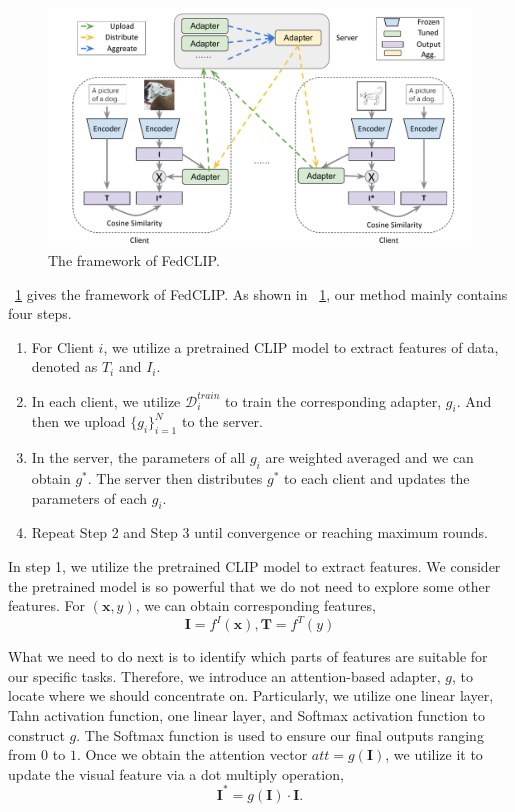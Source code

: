 \documentclass[11pt]{article}
\newcommand{\method}{FedCLIP\xspace}
\newcommand{\wjd}[1]{{\color{cyan}{[(WJD): #1]}}}
\begin{document}
\begin{figure}[t]
	\centering
    \includegraphics[width=.9\textwidth]{fig/frame.pdf}
	\caption{The framework of \method.} %
	\label{fig:frame1}
\end{figure}

\figurename~\ref{fig:frame1} gives the framework of \method.
As shown in \figurename~\ref{fig:frame1}, our method mainly contains four steps.

\begin{enumerate}
    \item For Client $i$, we utilize a pretrained CLIP model to extract features of data, denoted as $T_i$ and $I_i$.
    \item In each client, we utilize $\mathcal{D}^{train}_i$ to train the corresponding adapter, $g_i$. And then we upload $\{g_i\}_{i=1}^N$ to the server.
    \item In the server, the parameters of all $g_i$ are weighted averaged and we can obtain $g^*$. The server then distributes $g^*$ to each client and updates the parameters of each $g_i$.
    \item Repeat Step 2 and Step 3 until convergence or reaching maximum rounds.
\end{enumerate}

In step 1, we utilize the pretrained CLIP model to extract features. We consider the pretrained model is so powerful that we do not need to explore some other features.
For $(\mathbf{x},y)$, we can obtain corresponding features, %
\begin{equation}
\mathbf{I}=f^I(\mathbf{x}),
\mathbf{T}=f^T(y)
\end{equation}

What we need to do next is to identify which parts of features are suitable for our specific tasks.
Therefore, we introduce an attention-based adapter, $g$, to locate where we should concentrate on.
Particularly, we utilize one linear layer, Tahn activation function, one linear layer, and Softmax activation function to construct $g$.
The Softmax function is used to ensure our final outputs ranging from $0$ to $1$.
Once we obtain the attention vector $att=g(\mathbf{I})$, we utilize it to update the visual feature via a dot multiply operation, 
\begin{equation}
    \mathbf{I}^*= g(\mathbf{I})\cdot \mathbf{I}.
\end{equation}
\end{document}
